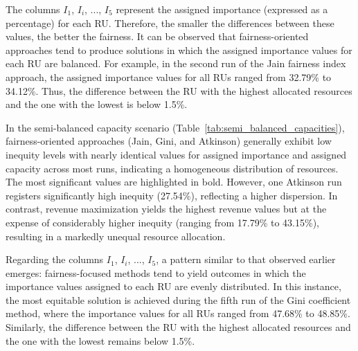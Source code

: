 \documentclass[preprint,12pt]{elsarticle}
\begin{document}
The columns $I_1$, $I_i$, ..., $I_5$ represent the assigned importance (expressed as a percentage) for each RU. Therefore, the smaller the differences between these values, the better the fairness. It can be observed that fairness-oriented approaches tend to produce solutions in which the assigned importance values for each RU are balanced. For example, in the second run of the Jain fairness index approach, the assigned importance values for all RUs ranged from 32.79\% to 34.12\%. Thus, the difference between the RU with the highest allocated resources and the one with the lowest is below 1.5\%.

In the semi-balanced capacity scenario (Table~\ref{tab:semi_balanced_capacities}), fairness-oriented approaches (Jain, Gini, and Atkinson) generally exhibit low inequity levels with nearly identical values for assigned importance and assigned capacity across most runs, indicating a homogeneous distribution of resources. The most significant values are highlighted in bold. However, one Atkinson run registers significantly high inequity (27.54\%), reflecting a higher dispersion. In contrast, revenue maximization yields the highest revenue values but at the expense of considerably higher inequity (ranging from 17.79\% to 43.15\%), resulting in a markedly unequal resource allocation.

Regarding the columns $I_1$, $I_i$, ..., $I_5$, a pattern similar to that observed earlier emerges: fairness-focused methods tend to yield outcomes in which the importance values assigned to each RU are evenly distributed. In this instance, the most equitable solution is achieved during the fifth run of the Gini coefficient method, where the importance values for all RUs ranged from 47.68\% to 48.85\%. Similarly, the difference between the RU with the highest allocated resources and the one with the lowest remains below 1.5\%.
\end{document}
